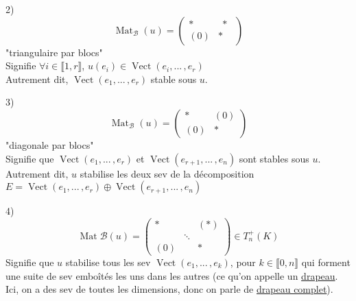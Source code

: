 \documentclass[10pt,a4paper]{article}
\theoremstyle{definition}
\DeclareMathOperator{\vect}{Vect}
\DeclareMathOperator{\Mat}{Mat}
\begin{document}
2) \[\Mat_\mathcal{B}(u) = \left(\begin{array}{c|c}
* & \:\:*\:\: \\
\hline
(0) & *
\end{array}\right)\]
"triangulaire par blocs" \\
Signifie $\forall i \in \llbracket 1, r \rrbracket$, $u(e_i) \in \vect(e_i, ...\, , e_r)$ \\
Autrement dit, $\vect(e_1, ...\, ,e_r)$ stable sous $u$.

3) \[\Mat_\mathcal{B}(u) = \left(\begin{array}{c|c}
* & (0) \\
\hline
(0) & *
\end{array}\right)\]
"diagonale par blocs" \\
Signifie que $\vect(e_1, ...\, , e_r)$ et $\vect(e_{r + 1}, ...\, , e_n)$ sont stables sous $u$. \\
Autrement dit, $u$ stabilise les deux sev de la décomposition $E = \vect(e_1, ...\, , e_r) \oplus \vect(e_{r + 1}, ...\, , e_n)$

4) \[\Mat\mathcal{B}(u) = \begin{pmatrix}
* & & (*) \\
 & \ddots & \\
(0) & & *
\end{pmatrix} \in T_n^+(K)\]
Signifie que $u$ stabilise tous les sev $\vect(e_1, ...\, , e_k)$, pour $k \in \llbracket 0, n \rrbracket$ qui forment une suite de sev emboîtés les uns dans les autres (ce qu'on appelle un \uline{drapeau}. Ici, on a des sev de toutes les dimensions, donc on parle de \uline{drapeau complet}).
\end{document}
